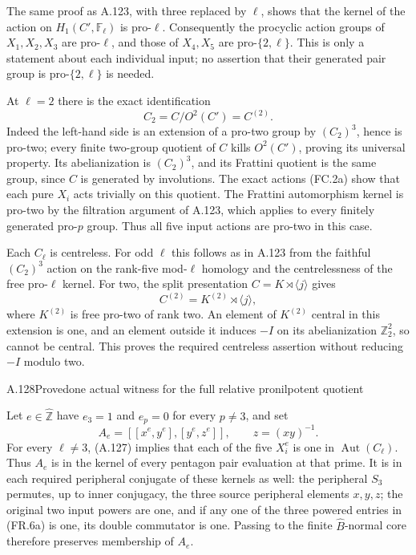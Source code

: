 The same proof as A.123, with three replaced by $\ell$, shows
that the kernel of the action on $H_1(C',\mathbb F_\ell)$
is pro-$\ell$. Consequently the procyclic action groups of
$X_1,X_2,X_3$ are pro-$\ell$, and those of $X_4,X_5$
are pro-$\{2,\ell\}$. This is only a statement about each
individual input; no assertion that their generated pair
group is pro-$\{2,\ell\}$ is needed.

At $\ell=2$ there is the exact identification
\[
                   C_2=C/O^2(C')=C^{(2)}.
 \tag{FR.5c}
\]
Indeed the left-hand side is an extension of a pro-two group
by $(C_2)^3$, hence is pro-two; every finite two-group quotient
of $C$ kills $O^2(C')$, proving its universal property.
Its abelianization is $(C_2)^3$, and its Frattini quotient is
the same group, since $C$ is generated by involutions. The
exact actions (FC.2a) show that each pure $X_i$ acts trivially
on this quotient. The Frattini automorphism kernel is pro-two
by the filtration argument of A.123, which applies to every
finitely generated pro-$p$ group. Thus all five input actions
are pro-two in this case.

Each $C_\ell$ is centreless. For odd $\ell$ this follows
as in A.123 from the faithful $(C_2)^3$ action on the rank-five
mod-$\ell$ homology and the centrelessness of the free pro-$\ell$
kernel. For two, the split presentation $C=K\rtimes\langle j\rangle$
gives
\[
                  C^{(2)}=K^{(2)}\rtimes\langle j\rangle,
\]
where $K^{(2)}$ is free pro-two of rank two. An element of
$K^{(2)}$ central in this extension is one, and an element
outside it induces $-I$ on its abelianization $\mathbb Z_2^2$,
so cannot be central. This proves the required centreless
assertion without reducing $-I$ modulo two.

\begin{statement}{A.128}{Proved}{one actual witness for the full relative pronilpotent quotient}
\end{statement}
Let $e\in\widehat{\mathbb Z}$ have $e_3=1$ and $e_p=0$
for every $p\ne3$, and set
\[
                 A_e=[[x^e,y^e],[y^e,z^e]],
                 \qquad z=(xy)^{-1}.
 \tag{FR.6a}
\]
For every $\ell\ne3$, (A.127) implies that each of the five
$X_i^e$ is one in $\operatorname{Aut}(C_\ell)$. Thus $A_e$
is in the kernel of every pentagon pair evaluation at that
prime. It is in each required peripheral conjugate of these
kernels as well: the peripheral $S_3$ permutes, up to inner
conjugacy, the three source peripheral elements $x,y,z$;
the original two input powers are one, and if any one of the
three powered entries in (FR.6a) is one, its double commutator
is one. Passing to the finite $\widehat B$-normal core therefore
preserves membership of $A_e$.

